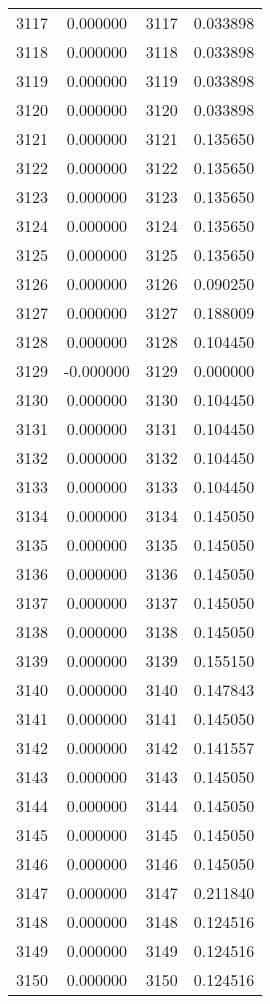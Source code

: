 \documentclass[12pt]{article}
\begin{document}
\begin{longtable}{@{}cccc@{}}
3117 & 0.000000 & 3117 & 0.033898 \\
3118 & 0.000000 & 3118 & 0.033898 \\
3119 & 0.000000 & 3119 & 0.033898 \\
3120 & 0.000000 & 3120 & 0.033898 \\
3121 & 0.000000 & 3121 & 0.135650 \\
3122 & 0.000000 & 3122 & 0.135650 \\
3123 & 0.000000 & 3123 & 0.135650 \\
3124 & 0.000000 & 3124 & 0.135650 \\
3125 & 0.000000 & 3125 & 0.135650 \\
3126 & 0.000000 & 3126 & 0.090250 \\
3127 & 0.000000 & 3127 & 0.188009 \\
3128 & 0.000000 & 3128 & 0.104450 \\
3129 & -0.000000 & 3129 & 0.000000 \\
3130 & 0.000000 & 3130 & 0.104450 \\
3131 & 0.000000 & 3131 & 0.104450 \\
3132 & 0.000000 & 3132 & 0.104450 \\
3133 & 0.000000 & 3133 & 0.104450 \\
3134 & 0.000000 & 3134 & 0.145050 \\
3135 & 0.000000 & 3135 & 0.145050 \\
3136 & 0.000000 & 3136 & 0.145050 \\
3137 & 0.000000 & 3137 & 0.145050 \\
3138 & 0.000000 & 3138 & 0.145050 \\
3139 & 0.000000 & 3139 & 0.155150 \\
3140 & 0.000000 & 3140 & 0.147843 \\
3141 & 0.000000 & 3141 & 0.145050 \\
3142 & 0.000000 & 3142 & 0.141557 \\
3143 & 0.000000 & 3143 & 0.145050 \\
3144 & 0.000000 & 3144 & 0.145050 \\
3145 & 0.000000 & 3145 & 0.145050 \\
3146 & 0.000000 & 3146 & 0.145050 \\
3147 & 0.000000 & 3147 & 0.211840 \\
3148 & 0.000000 & 3148 & 0.124516 \\
3149 & 0.000000 & 3149 & 0.124516 \\
3150 & 0.000000 & 3150 & 0.124516 \\

\end{longtable}
\end{document}
